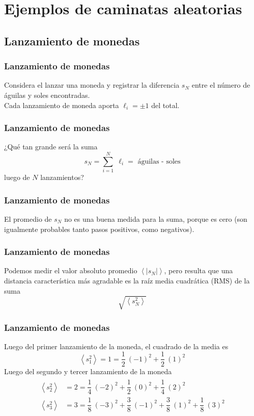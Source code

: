 \section{Ejemplos de caminatas aleatorias}
\subsection{Lanzamiento de monedas}
\begin{frame}
\frametitle{Lanzamiento de monedas}
Considera el lanzar una moneda y registrar la diferencia $s_{N}$ entre el número de águilas y soles encontradas.
\\
\bigskip
Cada lanzamiento de moneda aporta $\ell_{i} = \pm 1$ del total.
\pause
\end{frame}
\begin{frame}
\frametitle{Lanzamiento de monedas}
¿Qué tan grande será la suma
\[ s_{N} = \sum_{i = 1}^{N} \; \ell_{i} = \mbox{ águilas - soles} \]
luego de $N$ lanzamientos?
\end{frame}
\begin{frame}
\frametitle{Lanzamiento de monedas}
El promedio de $s_{N}$ no es una buena medida para la suma, porque es cero (son igualmente probables tanto pasos positivos, como negativos).
\end{frame}
\begin{frame}
\frametitle{Lanzamiento de monedas}
Podemos medir el valor absoluto promedio $\left\langle \vert s_{N} \vert \right\rangle$, pero resulta que una distancia característica más agradable es la raíz media cuadrática (RMS) de la suma 
\[ \sqrt{ \left\langle s_{N}^{2} \right\rangle } \]
\end{frame}
\begin{frame}
\frametitle{Lanzamiento de monedas}
Luego del primer lanzamiento de la moneda, el cuadrado de la media es
\begin{equation}
\left\langle s_{1}^{2} \right\rangle = 1 = \dfrac{1}{2} \: (-1)^{2} + \dfrac{1}{2} \: (1)^{2}
\label{eq:ecuacion_02_01}
\end{equation}
\pause
Luego del segundo y tercer lanzamiento de la moneda
\fontsize{12}{12}\selectfont
\begin{align}
\begin{aligned}
\left\langle s_{2}^{2} \right\rangle &= 2 = \dfrac{1}{4} \: (-2)^{2} + \dfrac{1}{2} \: (0)^{2} + \dfrac{1}{4} \: (2)^{2} \\
\left\langle s_{3}^{2} \right\rangle &= 3 = \dfrac{1}{8} \: (-3)^{2} + \dfrac{3}{8} \: (-1)^{2} + \dfrac{3}{8} \: (1)^{2} + \dfrac{1}{8} \: (3)^{2}
\end{aligned}
\label{eq:ecuacion_02_02}
\end{align}
\end{frame}

